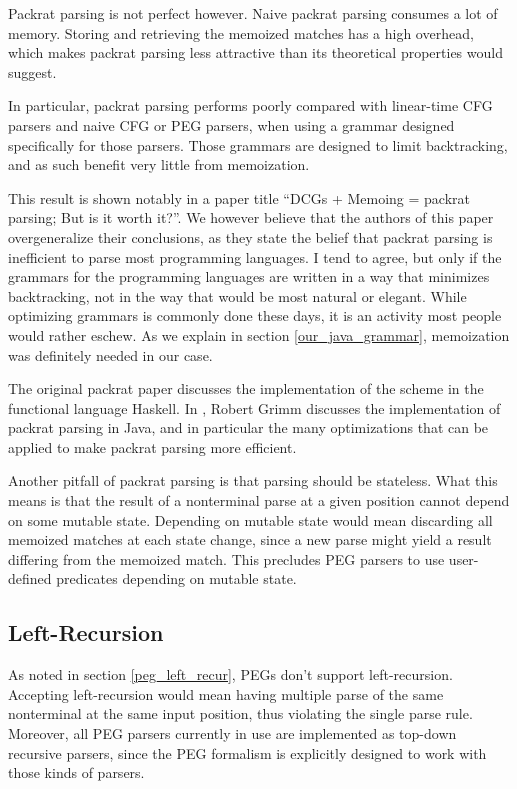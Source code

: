 Packrat parsing is not perfect however. Naive packrat parsing consumes a lot of
memory. Storing and retrieving the memoized matches has a high overhead, which
makes packrat parsing less attractive than its theoretical properties would
suggest.

In particular, packrat parsing performs poorly compared with linear-time CFG
parsers and naive CFG or PEG parsers, when using a grammar designed specifically
for those parsers. Those grammars are designed to limit backtracking, and as
such benefit very little from memoization.

This result is shown notably in a paper title ``DCGs + Memoing = packrat
parsing; But is it worth it?''. \cite{becket2008} We however believe that the
authors of this paper overgeneralize their conclusions, as they state the belief
that packrat parsing is inefficient to parse most programming languages. I tend
to agree, but only if the grammars for the programming languages are written in
a way that minimizes backtracking, not in the way that would be most natural or
elegant. While optimizing grammars is commonly done these days, it is an
activity most people would rather eschew. As we explain in section
\ref{our_java_grammar}, memoization was definitely needed in our case.

The original packrat paper \cite{ford2002} discusses the implementation of the
scheme in the functional language Haskell. In \cite{grimm2006}, Robert Grimm
discusses the implementation of packrat parsing in Java, and in particular the
many optimizations that can be applied to make packrat parsing more efficient.

Another pitfall of packrat parsing is that parsing should be stateless. What
this means is that the result of a nonterminal parse at a given position cannot
depend on some mutable state. Depending on mutable state would mean discarding
all memoized matches at each state change, since a new parse might yield a
result differing from the memoized match. This precludes PEG parsers to use
user-defined predicates depending on mutable state.

\subsection{Left-Recursion}
\label{peg_left_recursion}

As noted in section \ref{peg_left_recur}, PEGs don't support
left-recursion. Accepting left-recursion would mean having multiple parse of the
same nonterminal at the same input position, thus violating the single parse
rule. Moreover, all PEG parsers currently in use are implemented as top-down
recursive parsers, since the PEG formalism is explicitly designed to work with
those kinds of parsers.

